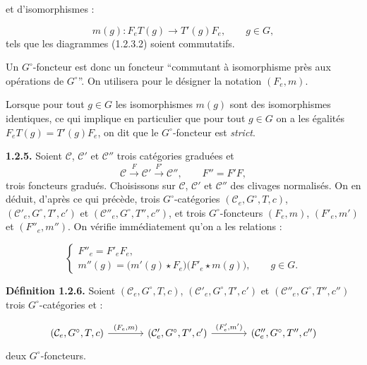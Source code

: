 %
et d'isomorphismes :

\[
  m(g)\colon F_eT(g)\longrightarrow T'(g)F_e,
  \qquad g\in G,
\]
tels que les diagrammes (1.2.3.2) soient commutatifs.

Un $G^\circ$-foncteur est donc un foncteur
“commutant à isomorphisme près aux opérations de $G^\circ$”. On
utilisera pour le désigner la notation $(F_e,m)$.

Lorsque pour tout $g\in G$ les isomorphismes $m(g)$ sont des
isomorphismes identiques, ce qui implique en particulier que pour tout
$g\in G$ on a les égalités $F_eT(g)=T'(g)F_e$, on dit que le
$G^\circ$-foncteur est \emph{strict}.

\noindent\textbf{1.2.5.}\quad
Soient $\mathcal C$, $\mathcal C'$ et $\mathcal C''$ trois catégories
graduées et
\[
  \mathcal C\xrightarrow{F}\mathcal C'
  \xrightarrow{F'}\mathcal C'',\qquad F''=F'F,
\]
trois foncteurs gradués. Choisissons sur $\mathcal C$, $\mathcal C'$ et
$\mathcal C''$ des clivages normalisés. On en déduit, d'après ce qui
précède, trois $G^\circ$-catégories
$(\mathcal C_e,G^\circ,T,c)$,
$(\mathcal C'_e,G^\circ,T',c')$ et
$(\mathcal C''_e,G^\circ,T'',c'')$, et trois $G^\circ$-foncteurs
$(F_e,m)$, $(F'_e,m')$ et $(F''_e,m'')$. On vérifie immédiatement qu'on a
les relations :

\begin{equation}
  \begin{cases}
    F''_e=F'_eF_e,\\[0.5em]
    m''(g)=\bigl(m'(g)\star F_e\bigr)
      \bigl(F'_e\star m(g)\bigr),\qquad g\in G.
  \end{cases}
  \tag{1.2.5.1}
\end{equation}

\noindent\textbf{Définition 1.2.6.}\quad
Soient $(\mathcal C_e,G^\circ,T,c)$,
$(\mathcal C'_e,G^\circ,T',c')$ et
$(\mathcal C''_e,G^\circ,T'',c'')$ trois $G^\circ$-catégories et :

\[
\begin{tikzcd}[column sep=large]
(\mathcal C_e,G^\circ,T,c)
  \arrow[r,"{(F_e,m)}"]
&
(\mathcal C'_e,G^\circ,T',c')
  \arrow[r,"{(F_e^{\prime},m^{\prime})}"]
&
(\mathcal C''_e,G^\circ,T'',c'')
\end{tikzcd}
\]
deux $G^\circ$-foncteurs.

